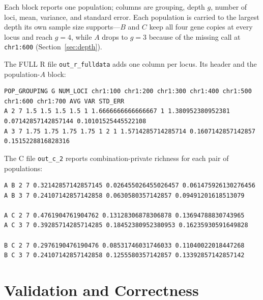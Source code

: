 \documentclass[11pt]{article}
\begin{document}
Each block reports one population; columns are grouping, depth \(g\), number of
loci, mean, variance, and standard error. Each population is carried to the
largest depth its own sample size supports---\(B\) and \(C\) keep all four gene
copies at every locus and reach \(g = 4\), while \(A\) drops to \(g = 3\) because
of the missing call at \texttt{chr1:600} (Section~\ref{sec:depth}).

The FULL R file \texttt{out\_r\_fulldata} adds one column per locus. Its header
and the population-\(A\) block:
\begin{lstlisting}[style=out]
POP_GROUPING G NUM_LOCI chr1:100 chr1:200 chr1:300 chr1:400 chr1:500 chr1:600 chr1:700 AVG VAR STD_ERR
A 2 7 1.5 1.5 1.5 1.5 1 1.6666666666666667 1 1.380952380952381 0.07142857142857144 0.10101525445522108
A 3 7 1.75 1.75 1.75 1.75 1 2 1 1.5714285714285714 0.1607142857142857 0.1515228816828316
\end{lstlisting}

The C file \texttt{out\_c\_2} reports combination-private richness for each pair
of populations:
\begin{lstlisting}[style=out]
A B 2 7 0.32142857142857145 0.026455026455026457 0.061475926130276456
A B 3 7 0.24107142857142858 0.0630580357142857 0.09491201618513079

A C 2 7 0.4761904761904762 0.13128306878306878 0.13694788830743965
A C 3 7 0.39285714285714285 0.18452380952380953 0.16235930591649828

B C 2 7 0.2976190476190476 0.08531746031746033 0.11040022018447268
B C 3 7 0.24107142857142858 0.1255580357142857 0.13392857142857142
\end{lstlisting}

\section{Validation and Correctness}
\label{sec:validation}
\end{document}
